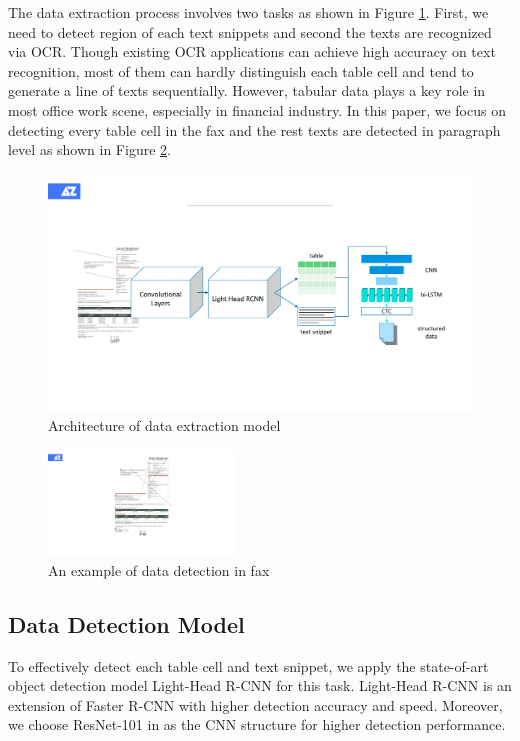 \documentclass[sigconf]{acmart}
\begin{document}
The data extraction process involves two tasks as shown in Figure \ref{figure4}. First, we need to detect region of each text snippets and second the texts are recognized via OCR. Though existing OCR applications can achieve high accuracy on text recognition, most of them can hardly distinguish each table cell and tend to generate a line of texts sequentially. However, tabular data plays a key role in most office work scene, especially in financial industry. In this paper, we focus on detecting every table cell in the fax and the rest texts are detected in paragraph level as shown in Figure \ref{figure6}.

\begin{figure}[h]
	\centering
	\includegraphics[width=\linewidth]{figure4}
	\caption{Architecture of data extraction model }
	\label{figure4}
\end{figure}


\begin{figure}[h]
	\centering
	\includegraphics[width=5cm]{figure6}
	\caption{An example of data detection in fax }
	\label{figure6}
\end{figure}

\subsection{Data Detection Model}
To effectively detect each table cell and text snippet, we apply the state-of-art object detection model Light-Head R-CNN \cite{li2017light} for this task. Light-Head R-CNN is an extension of Faster R-CNN with higher detection accuracy and speed. Moreover, we choose ResNet-101 in \cite{he2016deep} as the CNN structure for higher detection performance.
\end{document}
